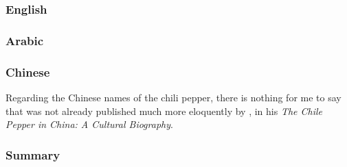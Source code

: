 \subsubsection{English}







\subsubsection{Arabic}





\subsubsection{Chinese}

Regarding the Chinese names of the chili pepper, there is nothing for me to say that was not already published much more eloquently by \textcite[]{dott_chile_2020}, in his \textit{The Chile Pepper in China: A Cultural Biography}.





\subsubsection{Summary}

















